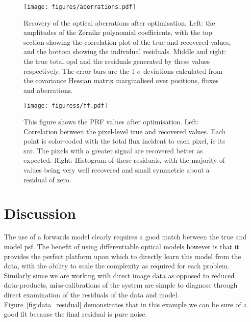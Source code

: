\documentclass[]{spieman}
\begin{document}
\begin{figure*}
    \centering
    \texttt{[image: figures/aberrations.pdf]}
    \caption{Recovery of the optical aberrations after optimisation. Left: the amplitudes of the Zernike polynomial coefficients, with the top section showing the correlation plot of the true and recovered values, and the bottom showing the individual residuals. Middle and right: the true total \ac{opd} and the residuals generated by these values respectively. The error bars are the 1-$\sigma$ deviations calculated from the covariance Hessian matrix marginalised over positions, fluxes and aberrations.}
    \label{fig:aberrations}
\end{figure*}

\begin{figure*}
    \centering
    \texttt{[image: figuress/ff.pdf]}
    \caption{This figure shows the PRF values after optimisation. Left: Correlation between the pixel-level true and recovered values. Each point is color-coded with the total flux incident to each pixel, ie its \ac{snr}. The pixels with a greater signal are recovered better as expected. Right: Histogram of these residuals, with the majority of values being very well recovered and small symmetric about a residual of zero.}
    \label{fig:flat_field}
\end{figure*}

\section{Discussion}

The use of a forwards model clearly requires a good match between the true and model \ac{psf}. The benefit of using differentiable optical models however is that it provides the perfect platform upon which to directly learn this model from the data, with the ability to scale the complexity as required for each problem. Similarly since we are working with direct image data as opposed to reduced data-products, miss-calibrations of the system are simple to diagnose through direct examination of the residuals of the data and model. Figure~\ref{fig:data_residual} demonstrates that in this example we can be sure of a good fit because the final residual is pure noise.
\end{document}

